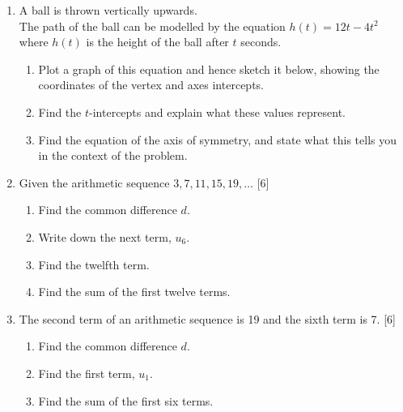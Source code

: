 \documentclass[12pt, twoside]{article}
\begin{document}
\begin{enumerate}
\newpage


\newpage
\item A ball is thrown vertically upwards.\\[0.25cm]
The path of the ball can be modelled by the equation $h(t)=12t-4t^2$ where $h(t)$ is the height of the ball after $t$ seconds.
    \begin{enumerate}
        \item Plot a graph of this equation and hence sketch it below, showing the coordinates of the vertex and axes intercepts.
        \item Find the $t$-intercepts and explain what these values represent. \vspace{2cm}
        \item Find the equation of the axis of symmetry, and state what this tells you in the context of the problem. \vspace{2cm}
    \end{enumerate}
    \begin{center}
    \end{center}

\newpage
\item Given the arithmetic sequence $3,7,11,15,19, \dots$ \hfill [6]
    \begin{enumerate}[itemsep=1cm]
    \item Find the common difference $d$.
    \item Write down the next term, $u_6$.
    \item Find the twelfth term.\vspace{1cm}
    \item Find the sum of the first twelve terms.
    \end{enumerate} \vspace{2cm}

    \item The second term of an arithmetic sequence is 19 and the sixth term is 7. \hfill [6]
    \begin{enumerate}[itemsep=3cm]
    \item Find the common difference $d$.
    \item Find the first term, $u_{1}$.
    \item Find the sum of the first six terms.
    \end{enumerate} \vspace{2cm}


\end{enumerate}
\end{document}
